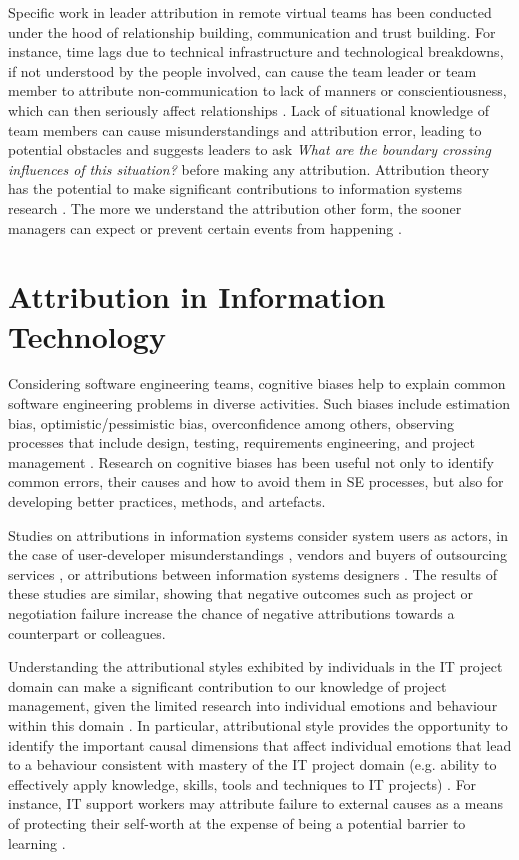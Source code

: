 Specific work in leader attribution in remote virtual teams has been conducted under the hood of relationship building,  communication and trust building.  For instance, time lags due to technical infrastructure and technological breakdowns, if not understood by the people involved, can cause the team leader or team member to attribute non-communication to lack of manners or conscientiousness, which can then seriously affect relationships \cite{Cramton2002}.  Lack of situational knowledge of team members can cause misunderstandings and attribution error, leading to potential obstacles and \cite{Pauleen2005} suggests leaders to ask \textit{What are the boundary crossing influences of this situation?} before making any attribution.  Attribution theory has the potential to make significant contributions to information systems research \cite{Standing2016}.  The more we understand the attribution other form, the sooner managers can expect or prevent certain events from happening \cite{Standing2016}.

\section{Attribution in Information Technology} \label{AttIT}

Considering software engineering teams, cognitive biases help to explain common software engineering problems in diverse activities. Such biases include estimation bias, optimistic/pessimistic bias, overconfidence among others, observing processes that include design, testing, requirements engineering, and project management \cite{Jorgensen2012, Fleischmann2014}. Research on cognitive biases has been useful not only to identify common errors, their causes and how to avoid them in SE processes, but also for developing better practices, methods, and artefacts. 

Studies on attributions in information systems consider system users as actors, in the case of user-developer misunderstandings \cite{Snead2014}, vendors and buyers of outsourcing services \cite{Rouse2007}, or attributions between information systems designers \cite{Peterson2002}. The results of these studies are similar, showing that negative outcomes such as project or negotiation failure increase the chance of negative attributions towards a counterpart or colleagues. 

Understanding the attributional styles exhibited by individuals in the IT project domain can make a significant contribution to our knowledge of project management, given the limited research into individual emotions and behaviour within this domain \cite{Standing2006}. In particular, attributional style provides the opportunity to identify the important causal dimensions that affect individual emotions that lead to a behaviour consistent with mastery of the IT project domain (e.g. ability to effectively apply knowledge, skills, tools and techniques to IT projects) \cite{pmi1996}. For instance, IT support workers may attribute failure to external causes as a means of protecting their self-worth at the expense of being a potential barrier to learning \cite{Duval2002}.

